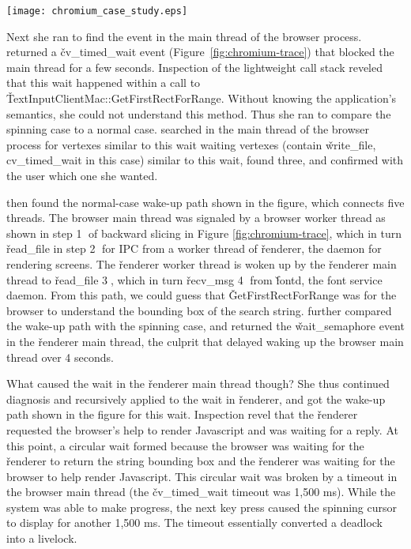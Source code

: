 \begin{figure*}[tb]
    \centering
    \texttt{[image: chromium\_case\_study.eps]}
    \caption{Chromium case study.}
    \label{fig:chromium-trace}
\end{figure*}

Next she ran \xxx to find the event in the main thread of the browser process.
\xxx returned a \v{cv\_timed\_wait} event (Figure~\ref{fig:chromium-trace})
that blocked the main thread for a few seconds.  Inspection of the lightweight
call stack reveled that this wait happened within a call to
\v{TextInputClientMac::GetFirstRectForRange}.  Without knowing the
application's semantics, she could not understand this method.  Thus she ran
\xxx to compare the spinning case to a normal case.  \xxx searched in the main
thread of the browser process for vertexes similar to this wait waiting
vertexes (contain \v{write\_file, cv\_timed\_wait} in this case) similar to
this wait, found three, and confirmed with the user which one she wanted.

\xxx then found the normal-case wake-up path shown in the figure, which
connects five threads.  The browser main thread was signaled by a browser
worker thread as shown in step \textcircled{1} of backward slicing in Figure
\ref{fig:chromium-trace}, which in turn \v{read\_file} in step \textcircled{2}
for IPC from a worker thread of \v{renderer}, the daemon for rendering screens.
The \v{renderer} worker thread is woken up by the \v{renderer} main thread to
\v{read\_file} \textcircled{3}, which in turn \v{recv\_msg} \textcircled{4}
from \v{fontd}, the font service daemon.  From this path, we could guess that
\v{GetFirstRectForRange} was for the browser to understand the bounding box of
the search string.  \xxx further compared the wake-up path with the spinning
case, and returned the \v{wait\_semaphore} event in the \v{renderer} main
thread, the culprit that delayed waking up the browser main thread over 4
seconds.

What caused the wait in the \v{renderer} main thread though?  She thus
continued diagnosis and recursively applied \xxx to the wait in
\v{renderer}, and got the wake-up path shown in the figure for this wait.
Inspection revel that the \v{renderer} requested the browser's help to
render Javascript and was waiting for a reply.  At this point, a circular
wait formed because the browser was waiting for the \v{renderer} to return
the string bounding box and the \v{renderer} was waiting for the browser
to help render Javascript.  This circular wait was broken by a timeout in
the browser main thread (the \v{cv\_timed\_wait} timeout was
1,500 ms).  While the system was able to make progress, the next key press
caused the spinning cursor to display for another 1,500 ms.  The timeout
essentially converted a deadlock into a livelock.

